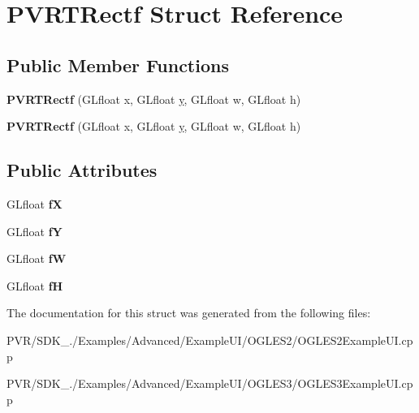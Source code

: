 \hypertarget{struct_p_v_r_t_rectf}{\section{P\+V\+R\+T\+Rectf Struct Reference}
\label{struct_p_v_r_t_rectf}
}
\subsection*{Public Member Functions}
\begin{DoxyCompactItemize}
\item 
\hypertarget{struct_p_v_r_t_rectf_a0ebb594a07dc29f83eb1f81edeb17b42}{{\bfseries P\+V\+R\+T\+Rectf} (G\+Lfloat x, G\+Lfloat \hyperlink{_ice_utils_8h_aa7ffaed69623192258fb8679569ff9ba}{y}, G\+Lfloat w, G\+Lfloat h)}\label{struct_p_v_r_t_rectf_a0ebb594a07dc29f83eb1f81edeb17b42}

\item 
\hypertarget{struct_p_v_r_t_rectf_a0ebb594a07dc29f83eb1f81edeb17b42}{{\bfseries P\+V\+R\+T\+Rectf} (G\+Lfloat x, G\+Lfloat \hyperlink{_ice_utils_8h_aa7ffaed69623192258fb8679569ff9ba}{y}, G\+Lfloat w, G\+Lfloat h)}\label{struct_p_v_r_t_rectf_a0ebb594a07dc29f83eb1f81edeb17b42}

\end{DoxyCompactItemize}
\subsection*{Public Attributes}
\begin{DoxyCompactItemize}
\item 
\hypertarget{struct_p_v_r_t_rectf_a0d8858ca0831d76bd833e49b494c40e5}{G\+Lfloat {\bfseries f\+X}}\label{struct_p_v_r_t_rectf_a0d8858ca0831d76bd833e49b494c40e5}

\item 
\hypertarget{struct_p_v_r_t_rectf_a477a829869a971b378e02efa74b8394b}{G\+Lfloat {\bfseries f\+Y}}\label{struct_p_v_r_t_rectf_a477a829869a971b378e02efa74b8394b}

\item 
\hypertarget{struct_p_v_r_t_rectf_a5c3b21f8274555c0bc73bac3b36c1fe3}{G\+Lfloat {\bfseries f\+W}}\label{struct_p_v_r_t_rectf_a5c3b21f8274555c0bc73bac3b36c1fe3}

\item 
\hypertarget{struct_p_v_r_t_rectf_aadb57829725b1e01f94444bd80336526}{G\+Lfloat {\bfseries f\+H}}\label{struct_p_v_r_t_rectf_aadb57829725b1e01f94444bd80336526}

\end{DoxyCompactItemize}


The documentation for this struct was generated from the following files\+:\begin{DoxyCompactItemize}
\item 
P\+V\+R/\+S\+D\+K\+\_./\+Examples/\+Advanced/\+Example\+U\+I/\+O\+G\+L\+E\+S2/O\+G\+L\+E\+S2\+Example\+U\+I.\+cpp\item 
P\+V\+R/\+S\+D\+K\+\_./\+Examples/\+Advanced/\+Example\+U\+I/\+O\+G\+L\+E\+S3/O\+G\+L\+E\+S3\+Example\+U\+I.\+cpp\end{DoxyCompactItemize}
